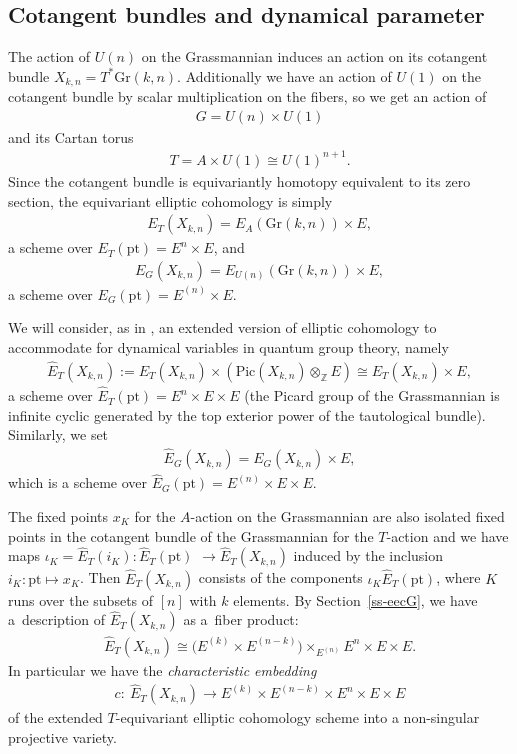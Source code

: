 \documentclass[pdftex]{sigma}
\numberwithin{equation}{section}
\begin{document}
\subsection{Cotangent bundles and dynamical parameter}\label{ss-Extended}
The action of $U(n)$ on the Grassmannian induces an action on its cotangent bundle $X_{k,n}=T^*\mathrm{Gr}(k,n)$. Additionally we have an action of $U(1)$ on the cotangent bundle by scalar multiplication on the fibers, so we get an action of
\begin{gather*}
 G=U(n)\times U(1)
\end{gather*}
and its Cartan torus
\begin{gather*}
 T=A\times U(1)\cong U(1)^{n+1}.
\end{gather*}
Since the cotangent bundle is equivariantly homotopy equivalent to its zero section, the equivariant elliptic cohomology is simply
\begin{gather*}
 E_T(X_{k,n})=E_A(\mathrm{Gr}(k,n))\times E,
\end{gather*}
a scheme over $E_T(\mathrm{pt})=E^{n}\times E$, and
\begin{gather*}
 E_G(X_{k,n})=E_{U(n)}(\mathrm{Gr}(k,n))\times E,
\end{gather*}
a scheme over $E_G(\mathrm{pt})=E^{(n)}\times E$.

We will consider, as in \cite{AO}, an extended version of elliptic cohomology to accommodate for dynamical variables in quantum group theory, namely
\begin{gather*}
 \hat E_T(X_{k,n}):=E_T(X_{k,n})\times (\mathrm{Pic}(X_{k,n})\otimes_{\mathbb Z}E)\cong E_T(X_{k,n})\times E,
\end{gather*}
a scheme over $\hat E_T(\mathrm{pt})=E^n\times E\times E$ (the Picard group of the Grassmannian is infinite cyclic generated by the top exterior power of the tautological bundle). Similarly, we set
\begin{gather*}
 \hat E_G(X_{k,n})=E_G(X_{k,n})\times E,
\end{gather*}
which is a scheme over $\hat E_G(\mathrm{pt})=E^{(n)}\times E\times E$.

The fixed points $x_K$ for the $A$-action on the Grassmannian are also isolated fixed points in the cotangent bundle of the Grassmannian for the $T$-action and we have maps $\iota_K=\hat E_T(i_K)\colon \hat E_T(\mathrm{pt})$ $\to \hat E_T(X_{k,n})$ induced by the inclusion $i_K\colon \mathrm{pt} \mapsto x_K$. Then $\hat E_T(X_{k,n})$ consists of the components $\iota_K\hat E_T(\mathrm{pt})$, where $K$ runs over the subsets of $[n]$ with $k$ elements. By Section~\ref{ss-eecG}, we have a~description of $\hat E_T(X_{k,n})$ as a~fiber product:
\begin{gather*}
\hat E_T(X_{k,n})\cong \big(E^{(k)}\times E^{(n-k)}\big)\times_{E^{(n)}}E^n\times E\times E.
\end{gather*}
In particular we have the {\em characteristic embedding}
\begin{gather}\label{e-ce}
c\colon \ \hat E_T(X_{k,n})\to E^{(k)}\times E^{(n-k)}\times E^{n}\times E\times E
\end{gather}
of the extended $T$-equivariant elliptic cohomology scheme into a non-singular projective variety.
\end{document}
